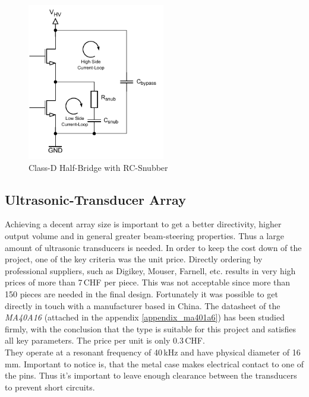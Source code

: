 \begin{figure}[h!]
	\centering
	\includegraphics[width=6cm]{images/4_Design/Hardware/Class D Snubber.pdf}
	\vspace{-0.2cm}
    \caption{Class-D Half-Bridge with RC-Snubber}
    \label{fig:rc-snubber}
\end{figure}


\pagebreak
\subsection{Ultrasonic-Transducer Array}
Achieving a decent array size is important to get a better directivity, higher output volume and in general greater beam-steering properties. Thus a large amount of ultrasonic transducers is needed. In order to keep the cost down of the project, one of the key criteria was the unit price. Directly ordering by professional suppliers, such as Digikey, Mouser, Farnell, etc. results in very high prices of more than 7\,CHF per piece. This was not acceptable since more than 150 pieces are needed in the final design. Fortunately it was possible to get directly in touch with a manufacturer based in China. The datasheet of the \textit{MA40A16} (attached in the appendix \ref{appendix_ma401a6}) has been studied firmly, with the conclusion that the type is suitable for this project and satisfies all key parameters. The price per unit is only 0.3\,CHF.\\
They operate at a resonant frequency of 40\,kHz and have physical diameter of 16\,mm. Important to notice is, that the metal case makes electrical contact to one of the pins. Thus it's important to leave enough clearance between the transducers to prevent short circuits.

